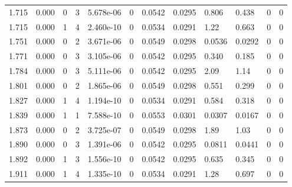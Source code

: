\documentclass[preview]{standalone}
\begin{document}
{{{\begin{tabular}{L{1.2cm}C{1.2cm} C{0.3cm}C{0.5cm} C{1.4cm}C{1.4cm} C{1.4cm}C{1.4cm} C{1.6cm}C{1.6cm} C{1.6cm}C{1.6cm}}
  1.715  &  0.000  & 0     &  3 &  5.678e-06  & 0  &  0.0542&   0.0295& 0.806 & 0.438   &  0 & 0  \\ 
  1.715  &  0.000  & 1     &  4 &  2.460e-10  & 0  &  0.0534&   0.0291& 1.22 & 0.663   &  0 & 0  \\ 
  1.751  &  0.000  & 0     &  2 &  3.671e-06  & 0  &  0.0549&   0.0298& 0.0536 & 0.0292   &  0 & 0  \\ 
  1.771  &  0.000  & 0     &  3 &  3.105e-06  & 0  &  0.0542&   0.0295& 0.340 & 0.185   &  0 & 0  \\ 
  1.784  &  0.000  & 0     &  3 &  5.111e-06  & 0  &  0.0542&   0.0295& 2.09 & 1.14   &  0 & 0  \\ 
  1.801  &  0.000  & 0     &  2 &  1.865e-06  & 0  &  0.0549&   0.0298& 0.551 & 0.299   &  0 & 0  \\ 
  1.827  &  0.000  & 1     &  4 &  1.194e-10  & 0  &  0.0534&   0.0291& 0.584 & 0.318   &  0 & 0  \\ 
  1.839  &  0.000  & 1     &  1 &  7.588e-10  & 0  &  0.0553&   0.0301& 0.0307 & 0.0167   &  0 & 0  \\ 
  1.873  &  0.000  & 0     &  2 &  3.725e-07  & 0  &  0.0549&   0.0298& 1.89 & 1.03   &  0 & 0  \\ 
  1.890  &  0.000  & 0     &  3 &  1.391e-06  & 0  &  0.0542&   0.0295& 0.0811 & 0.0441   &  0 & 0  \\ 
  1.892  &  0.000  & 1     &  3 &  1.556e-10  & 0  &  0.0542&   0.0295& 0.635 & 0.345   &  0 & 0  \\ 
  1.911  &  0.000  & 1     &  4 &  1.335e-10  & 0  &  0.0534&   0.0291& 1.28 & 0.697   &  0 & 0  \\ 
\hline 
\end{tabular} 

}}}
\end{document}

